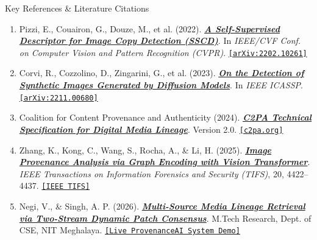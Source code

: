 \documentclass[aspectratio=169,xcolor=table,10pt]{beamer}
\begin{document}
\begin{frame}{Key References \& Literature Citations}
  \footnotesize
  \begin{enumerate}
    \setlength{\itemsep}{6pt}
    \item Pizzi, E., Couairon, G., Douze, M., et al. (2022). \href{https://arxiv.org/abs/2202.10261}{\textbf{\textit{A Self-Supervised Descriptor for Image Copy Detection (SSCD)}}}. In \textit{IEEE/CVF Conf. on Computer Vision and Pattern Recognition (CVPR)}. \href{https://arxiv.org/abs/2202.10261}{\texttt{[arXiv:2202.10261]}}
    
    \item Corvi, R., Cozzolino, D., Zingarini, G., et al. (2023). \href{https://arxiv.org/abs/2211.00680}{\textbf{\textit{On the Detection of Synthetic Images Generated by Diffusion Models}}}. In \textit{IEEE ICASSP}. \href{https://arxiv.org/abs/2211.00680}{\texttt{[arXiv:2211.00680]}}
    
    \item Coalition for Content Provenance and Authenticity (2024). \href{https://c2pa.org/specifications/specifications/2.0/specs/C2PA_Specification.html}{\textbf{\textit{C2PA Technical Specification for Digital Media Lineage}}}. Version 2.0. \href{https://c2pa.org}{\texttt{[c2pa.org]}}
    
    \item Zhang, K., Kong, C., Wang, S., Rocha, A., \& Li, H. (2025). \href{https://ieeexplore.ieee.org/document/10874312}{\textbf{\textit{Image Provenance Analysis via Graph Encoding with Vision Transformer}}}. \textit{IEEE Transactions on Information Forensics and Security (TIFS)}, 20, 4422--4437. \href{https://ieeexplore.ieee.org/document/10874312}{\texttt{[IEEE TIFS]}}
    
    \item Negi, V., \& Singh, A. P. (2026). \href{https://infants-ver-scenes-depend.trycloudflare.com}{\textbf{\textit{Multi-Source Media Lineage Retrieval via Two-Stream Dynamic Patch Consensus}}}. M.Tech Research, Dept. of CSE, NIT Meghalaya. \href{https://infants-ver-scenes-depend.trycloudflare.com}{\texttt{[Live ProvenanceAI System Demo]}}
  \end{enumerate}
\end{frame}
\end{document}

